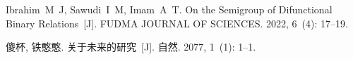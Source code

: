 \pagestyle{fancy}
\fancyhead{} %

\fancyhead[CO]{\leftmark} %



\begin{thebibliography}{99}


Ibrahim~M~J, Sawudi~I~M, Imam~A~T.
On the Semigroup of Difunctional Binary Relations~[J].
FUDMA JOURNAL OF SCIENCES.
2022, 6~(4):  17--19.

傻杯, 铁憨憨.
关于未来的研究~[J].
自然.
2077, 1~(1):  1--1.

\end{thebibliography}

